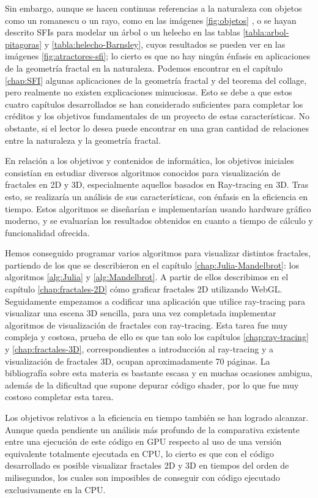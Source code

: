 Sin embargo, aunque se hacen continuas referencias a la naturaleza con objetos como un romanescu o un rayo, como en las imágenes \ref{fig:objetos} , o se hayan descrito SFIs para modelar un árbol o un helecho en las tablas \ref{tabla:arbol-pitagoras} y \ref{tabla:helecho-Barnsley}, cuyos resultados se pueden ver en las imágenes \ref{fig:atractores-sfi}; lo cierto es que no hay ningún énfasis en aplicaciones de la geometría fractal en la naturaleza. Podemos encontrar en el capítulo \ref{chap:SFI} algunas aplicaciones de la geometría fractal y del teorema del collage, pero realmente no existen explicaciones minuciosas. Esto se debe a que estos cuatro capítulos desarrollados se han considerado suficientes para completar los créditos y los objetivos fundamentales de un proyecto de estas características. No obstante, si el lector lo desea puede encontrar en \cite{Mandelbrot} una gran cantidad de relaciones entre la naturaleza y la geometría fractal.

En relación a los objetivos y contenidos de informática, los objetivos iniciales consistían en estudiar diversos algoritmos conocidos para visualización de fractales en 2D y 3D, especialmente aquellos basados en Ray-tracing en 3D. Tras esto, se realizaría un análisis de sus características, con énfasis en la eficiencia en tiempo. Estos algoritmos se diseñarían e implementarían usando hardware gráfico moderno, y se evaluarían los resultados obtenidos en cuanto a tiempo de cálculo y funcionalidad ofrecida.

Hemos conseguido programar varios algoritmos para visualizar distintos fractales, partiendo de los que se describieron en el capítulo \ref{chap:Julia-Mandelbrot}: los algoritmos \ref{alg:Julia} y \ref{alg:Mandelbrot}. A partir de ellos describimos en el capítulo \ref{chap:fractales-2D} cómo graficar fractales 2D utilizando WebGL. Seguidamente empezamos a codificar una aplicación que utilice ray-tracing para visualizar una escena 3D sencilla, para una vez completada implementar algoritmos de visualización de fractales con ray-tracing. Esta tarea fue muy compleja y costosa, prueba de ello es que tan solo los capítulos \ref{chap:ray-tracing} y \ref{chap:fractales-3D}, correspondientes a introducción al ray-tracing y a visualización de fractales 3D, ocupan aproximadamente 70 páginas. La bibliografía sobre esta materia es bastante escasa y en muchas ocasiones ambigua, además de la dificultad que supone depurar código shader, por lo que fue muy costoso completar esta tarea.

Los objetivos relativos a la eficiencia en tiempo también se han logrado alcanzar. Aunque queda pendiente un análisis más profundo de la comparativa existente entre una ejecución de este código en GPU respecto al uso de una versión equivalente totalmente ejecutada en CPU, lo cierto es que con el código desarrollado es posible visualizar fractales 2D y 3D en tiempos del orden de milisegundos, los cuales son imposibles de conseguir con código ejecutado exclusivamente en la CPU.